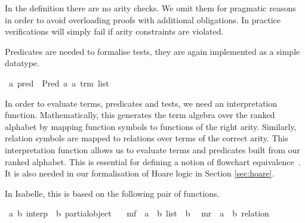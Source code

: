 \documentclass{llncs}
\begin{document}
In the definition there are no arity checks. We omit them for
pragmatic reasons in order to avoid overloading proofs with additional
obligations. In practice verifications will simply fail if arity
constraints are violated.

Predicates are needed to formalise tests, they are again implemented
as a simple datatype.

\begin{isabellebody}
\isanewline
{}\isamarkupfalse%
\ {}a\ pred\ {}\ Pred\ {}a\ {}{}a\ trm\ list{}\isanewline
\end{isabellebody}

In order to evaluate terms, predicates and tests, we need an
interpretation function. Mathematically, this generates the term
algebra over the ranked alphabet by mapping function symbols to
functions of the right arity. Similarly, relation symbols are mapped
to relations over terms of the correct arity. This interpretation
function allows us to evaluate terms and predicates built from our
ranked alphabet. This is essential for defining a notion of flowchart
equivalence~\cite{Angus01,Manna}. It is also needed in our
formalisation of Hoare logic in Section \ref{sec:hoare}.

In Isabelle, this is based on the following pair of functions.

\begin{isabellebody}
\isanewline
{}\isamarkupfalse%
\ {}{}a{}\ {}b{}\ interp\ {}\ {}{}b\ partial{}object{}\ {}\isanewline
\ \ mf\ {}{}\ {}{}a\ {}\ {}b\ list\ {}\ {}b{}\isanewline
\ \ mr\ {}{}\ {}{}a\ {}\ {}b\ relation{}\isanewline
\end{isabellebody}
\end{document}
